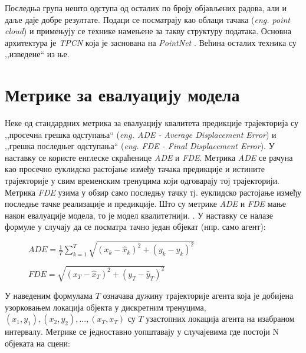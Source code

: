 \documentclass[11pt,oneside]{memoir}
\begin{document}
Последња група нешто одступа од осталих по броју објављених радова, 
али и даље даје добре резултате. Подаци се посматрају као облаци тачака (\textit{eng. point cloud}) 
и примењују се технике намењене за такву структуру података. Основна
архитектура је \textit{TPCN} \cite{tpcn} која је заснована на \textit{PointNet} \cite{pointnet}. Већина осталих техника су ,,изведене`` из ње.


\chapter{Метрике за евалуацију модела}
\label{chp:razrada}

Неке од стандардних метрика за евалуацију квалитета предикције трајекторија су ,,просечнa грешка одступања`` (\textit{eng. ADE - Average Displacement Error})
и ,,грешка последњег одступања`` (\textit{eng. FDE - Final Displacement Error}). У наставку се користе енглеске скраћенице \textit{ADE} и
\textit{FDE}. Метрика \textit{ADE} се рачуна као просечно еуклидско растојање између тачака предикције и истините трајекторије у свим
временским тренуцима који одговарају тој трајекторији. 
Метрика \textit{FDE} узима у обзир само последњу тачку тј. еуклидско растојање између последње тачке реализације и предикције.
Што су метрике \textit{ADE} и \textit{FDE} мање након евалуације модела, то је модел квалитетнији. \cite{social_gan, argoverse}.  
У наставку се налазе формуле у случају да се посматра тачно један објекат (нпр. само агент):

\begin{figure}[H]
  \centering
  $ADE = \frac{1}{T}\sum_{k=1}^{T}\sqrt{(x_k - \hat{x}_k)^2 + (y_k - \hat{y}_k)^2}$
\end{figure}


\begin{figure}[H]
  \centering
  $FDE = \sqrt{(x_{T} - \hat{x}_{T})^2 + (y_{T} - \hat{y}_{T})^2}$
\end{figure}

У наведеним формулама $T$ означава дужину трајекторије агента која је добијена узорковањем локација објекта у дискретним тренуцима, 
$(x_{1}, y_{1}), (x_{2}, y_{2}), ..., (x_{T}, x_{T})$ су $T$ узастопних локација агента на изабраном интервалу. 
Метрике се једноставно уопштавају у случајевима где постоји N објеката на сцени:
\end{document}
